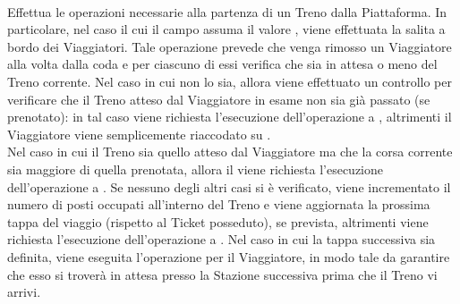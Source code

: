 \begin{description}
		\item {}\\
		Effettua le operazioni necessarie alla partenza di un Treno dalla Piattaforma. In particolare, nel caso il cui il campo  assuma il valore , viene effettuata la salita a bordo dei Viaggiatori. Tale operazione prevede che venga rimosso un Viaggiatore alla volta dalla coda  e per ciascuno di essi verifica che sia in attesa o meno del Treno corrente. Nel caso in cui non lo sia, allora viene effettuato un controllo per verificare che il Treno atteso dal Viaggiatore in esame non sia già passato (se prenotato): in tal caso viene richiesta l'esecuzione dell'operazione  a , altrimenti il Viaggiatore viene semplicemente riaccodato su . \\
		Nel caso in cui il Treno sia quello atteso dal Viaggiatore ma che la corsa corrente sia maggiore di quella prenotata, allora il  viene richiesta l'esecuzione dell'operazione  a . Se nessuno degli altri casi si è verificato, viene incrementato il numero di posti occupati all'interno del Treno e viene aggiornata la prossima tappa del viaggio (rispetto al Ticket posseduto), se prevista, altrimenti viene richiesta l'esecuzione dell'operazione  a . Nel caso in cui la tappa successiva sia definita, viene eseguita l'operazione  per il Viaggiatore, in modo tale da garantire che esso si troverà in attesa presso la Stazione successiva prima che il Treno vi arrivi.
		
	\end{description}
	
